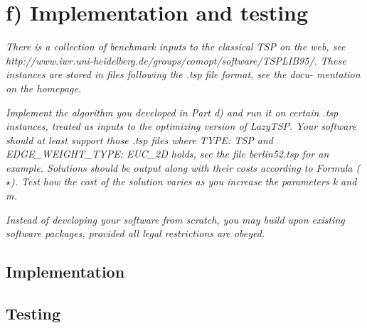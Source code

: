 
\section{f) Implementation and testing}

\textit{There is a collection of benchmark inputs to the classical TSP on the web, see
http://www.iwr.uni-heidelberg.de/groups/comopt/software/TSPLIB95/.
These instances are stored in files following the .tsp file format, see the docu-
mentation on the homepage.
}

\textit{Implement the algorithm you developed in Part d) and run it on certain .tsp
instances, treated as inputs to the optimizing version of LazyTSP. Your software
should at least support those .tsp files where TYPE: TSP and EDGE\_WEIGHT\_TYPE:
EUC\_2D holds, see the file berlin52.tsp for an example. Solutions should be
output along with their costs according to Formula (\(\star\)). Test how the cost of the
solution varies as you increase the parameters k and m.
}

\textit{Instead of developing your software from scratch, you may build upon existing
software packages, provided all legal restrictions are obeyed.
}

\subsection{Implementation}

\subsection{Testing}


